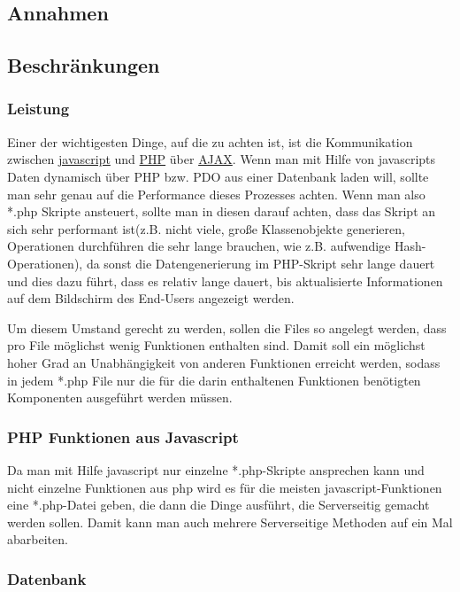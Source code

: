 \documentclass[10pt,a4paper]{scrartcl}
\begin{document}
\subsection{Annahmen}

\subsection{Beschränkungen}

\subsubsection*{Leistung}

Einer der wichtigesten Dinge, auf die zu achten ist, ist die Kommunikation zwischen \underline{javascript} und \underline{PHP} 
über \underline{AJAX}. Wenn man mit Hilfe von javascripts Daten dynamisch über PHP bzw. PDO aus einer Datenbank laden will, sollte man
sehr genau auf die Performance dieses Prozesses achten. Wenn man also *.php Skripte ansteuert, sollte man in diesen darauf achten, dass
das Skript an sich sehr performant ist(z.B. nicht viele, große Klassenobjekte generieren, Operationen durchführen die sehr lange brauchen,
wie z.B. aufwendige Hash-Operationen), da sonst die Datengenerierung im PHP-Skript sehr lange dauert und dies dazu führt, dass 
es relativ lange dauert, bis aktualisierte Informationen auf dem Bildschirm des End-Users angezeigt werden.

Um diesem Umstand gerecht zu werden, sollen die Files so angelegt werden, dass pro File möglichst wenig Funktionen enthalten sind.
Damit soll ein möglichst hoher Grad an Unabhängigkeit von anderen Funktionen erreicht werden, sodass in jedem *.php File nur die 
für die darin enthaltenen Funktionen benötigten Komponenten ausgeführt werden müssen.

\subsubsection*{PHP Funktionen aus Javascript}

Da man mit Hilfe javascript nur einzelne *.php-Skripte ansprechen kann und nicht einzelne Funktionen aus php wird es für die meisten javascript-Funktionen eine *.php-Datei geben, die dann die Dinge ausführt, die Serverseitig gemacht werden sollen. Damit kann man auch mehrere Serverseitige Methoden auf ein Mal abarbeiten.


\subsubsection*{Datenbank}
\end{document}

